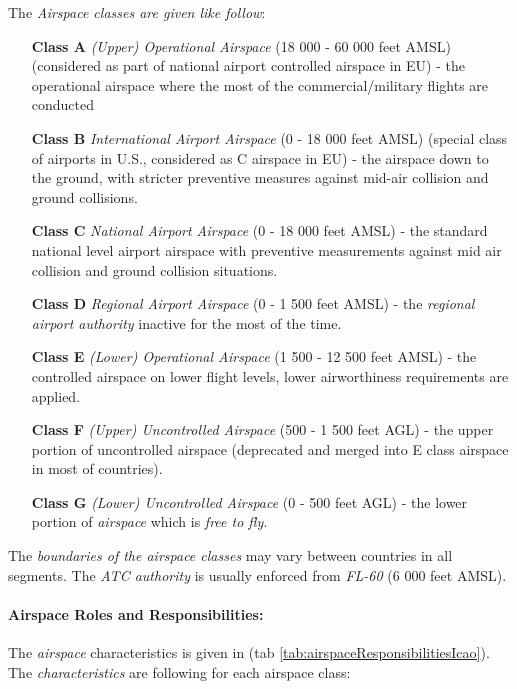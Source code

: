 \newpage
\noindent The \emph{Airspace classes are given like follow}:
\begin{enumerate}
    \item[\textbf{Class A}] \emph{(Upper) Operational Airspace} (18 000 - 60 000 feet AMSL) (considered as part of national airport controlled airspace in EU) - the operational airspace where the most of the commercial/military flights are conducted
    
    \item[\textbf{Class B}] \emph{International Airport Airspace} (0 - 18 000 feet AMSL) (special class of airports in U.S., considered as C airspace in EU) - the airspace down to the ground, with stricter preventive measures against mid-air collision and ground collisions.
    
    \item[\textbf{Class C}] \emph{National Airport Airspace} (0 - 18 000 feet AMSL) - the standard  national level airport airspace with preventive measurements against mid air collision and ground collision situations.
    
    \item[\textbf{Class D}] \emph{Regional Airport Airspace} (0 - 1 500 feet AMSL) - the \emph{regional airport authority} inactive for the most of the time.
    
    \item[\textbf{Class E}] \emph{(Lower) Operational Airspace} (1 500 - 12 500 feet AMSL) - the controlled airspace on lower flight levels, lower airworthiness requirements are applied.
    
    \item[\textbf{Class F}] \emph{(Upper) Uncontrolled Airspace} (500 - 1 500 feet AGL) - the upper portion of uncontrolled airspace (deprecated and merged into E class airspace in most of countries).
    
    \item[\textbf{Class G}] \emph{(Lower) Uncontrolled Airspace} (0 - 500 feet AGL) - the lower portion of \emph{airspace} which is \emph{free to fly}.
\end{enumerate}

\begin{note}
    The \emph{boundaries of the airspace classes} may vary between countries in all segments. The \emph{ATC authority} is usually enforced from \emph{FL-60} (6 000 feet AMSL).
\end{note}


\paragraph{Airspace Roles and Responsibilities:} The \emph{airspace} characteristics is given in (tab \ref{tab:airspaceResponsibilitiesIcao}). The \emph{characteristics} are following for each airspace class:

